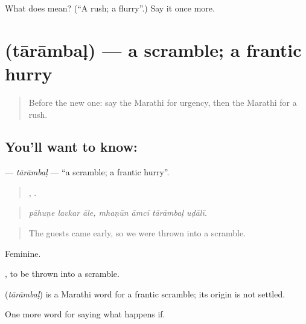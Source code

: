 \begin{tcolorbox}[breakable,colback=teal!4,colframe=teal!35!black,title={Before you move on}]
What does  mean? (\textquotedblleft{}A rush; a flurry\textquotedblright{}.) Say it once more.
\end{tcolorbox}
\section[\texorpdfstring{\mr{तारांबळ} (tārāmbaḷ)}{तारांबळ (tārāmbaḷ)}]{ (tārāmbaḷ) — a scramble; a frantic hurry}

\label{lesson:MR-C555-tarambal}



\begin{quote}
Before the new one: say the Marathi for urgency, then the Marathi for a rush.
\end{quote}

\subsection*{You'll want to know: }
\textbf{} — \emph{tārāmbaḷ} — \textquotedblleft{}a scramble; a frantic hurry\textquotedblright{}.

\begin{quote}
  ,    .
\end{quote}

\begin{quote}
\emph{pāhuṇe lavkar āle, mhaṇūn āmcī tārāmbaḷ uḍālī.}
\end{quote}

\begin{quote}
The guests came early, so we were thrown into a scramble.
\end{quote}

Feminine.

 , to be thrown into a scramble.

\begin{cousinweb}
\textbf{} (\emph{tārāmbaḷ}) is a Marathi word for a frantic scramble; its origin is not settled.
\end{cousinweb}

\begin{grammarlens}[title={What you've built}]
One more word for saying what happens if.
\end{grammarlens}

